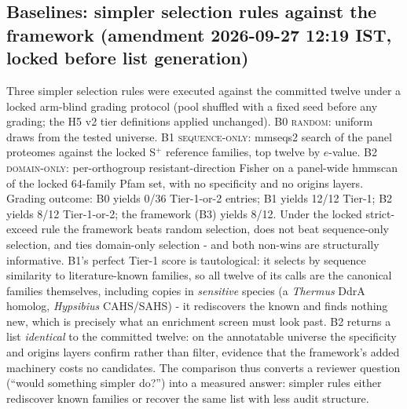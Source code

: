 \documentclass[12pt,a4paper]{article}
\begin{document}
\subsection{Baselines: simpler selection rules against the framework (amendment 2026-09-27 12:19 IST, locked before list generation)}
Three simpler selection rules were executed against the committed twelve under a locked arm-blind grading protocol (pool shuffled with a fixed seed before any grading; the H5 v2 tier definitions applied unchanged). \textsc{B0 random}: uniform draws from the tested universe. \textsc{B1 sequence-only}: mmseqs2 search of the panel proteomes against the locked S$^+$ reference families, top twelve by $e$-value. \textsc{B2 domain-only}: per-orthogroup resistant-direction Fisher on a panel-wide hmmscan of the locked 64-family Pfam set, with no specificity and no origins layers. Grading outcome: B0 yields 0/36 Tier-1-or-2 entries; B1 yields 12/12 Tier-1; B2 yields 8/12 Tier-1-or-2; the framework (B3) yields 8/12. Under the locked strict-exceed rule the framework beats random selection, does not beat sequence-only selection, and ties domain-only selection - and both non-wins are structurally informative. B1's perfect Tier-1 score is tautological: it selects by sequence similarity to literature-known families, so all twelve of its calls are the canonical families themselves, including copies in \emph{sensitive} species (a \emph{Thermus} DdrA homolog, \emph{Hypsibius} CAHS/SAHS) - it rediscovers the known and finds nothing new, which is precisely what an enrichment screen must look past. B2 returns a list \emph{identical} to the committed twelve: on the annotatable universe the specificity and origins layers confirm rather than filter, evidence that the framework's added machinery costs no candidates. The comparison thus converts a reviewer question (``would something simpler do?'') into a measured answer: simpler rules either rediscover known families or recover the same list with less audit structure.
\end{document}
